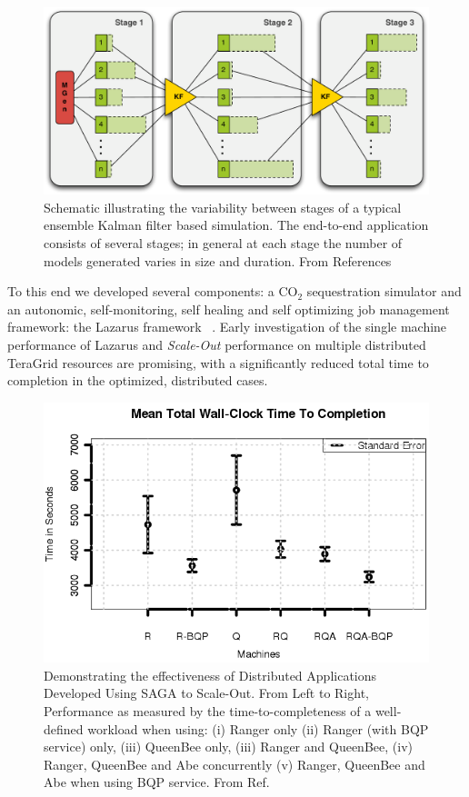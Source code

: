 \documentclass[a4paper,10pt]{article}
\begin{document}
\begin{figure}
\begin{center}
\includegraphics*[scale=0.4,angle=0]{3StageKalmanFilter}
\end{center}
\caption{Schematic illustrating the variability between stages of a typical
  ensemble Kalman filter based simulation. The end-to-end
  application consists of several stages; in general at each stage the
  number of models generated varies in size and duration. From References~\cite{teragrid08, gmac}}
\label{fig:irregular_execution}
\end{figure}

To this end we developed several components: a CO$_2$ sequestration simulator and an autonomic, self-monitoring, self healing and self optimizing job management framework: the Lazarus framework ~\cite{gmac}. Early investigation of the single machine performance of Lazarus and {\it Scale-Out} performance on multiple distributed TeraGrid resources are promising, with a significantly reduced total time to completion in the optimized, distributed cases.

\begin{figure}
\begin{center}
\includegraphics[scale=0.8]{Figure7.png}
\end{center}
\caption{Demonstrating the effectiveness of Distributed Applications Developed  Using SAGA to Scale-Out. From Left to Right, Performance as measured by the time-to-completeness of a well-defined workload when using: (i) Ranger only (ii) Ranger (with BQP service) only, (iii) QueenBee only, (iii) Ranger and QueenBee, (iv) Ranger, QueenBee and Abe concurrently (v) Ranger, QueenBee 
  and Abe when using BQP service. From Ref.~\cite{gmac} }
\label{fig:results}
\end{figure}
\end{document}
